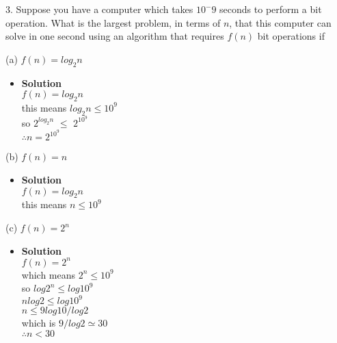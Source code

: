 \documentclass[11pt]{article}
\begin{document}
\begin{enumerate}

\begin{flushleft}
{\large 3. Suppose you have a computer which takes $10^−9$ seconds to perform a bit operation. What is the
largest problem, in terms of $n$, that this computer can solve in one second using an algorithm that
requires $f(n)$ bit operations if}\\
\end{flushleft}


\large (a) $f(n) = log_2 n$\\


\begin{itemize}

\item \textbf{Solution}\\
\large  $f(n) = log_2 n$ \\
\large this means $log_2 n \leq 10^9$\\
\large so $2^{log_2n}$ $\leq$ $2^{10^9}$\\
\large $\therefore n = 2^{10^9}$\\
\end {itemize}


\large (b) $f(n) = n$\\


\begin{itemize}

\item \textbf{Solution}\\
\large  $f(n) = log_2 n$ \\
\large this means $n \leq 10^9$\\


\end {itemize}


\large (c) $f(n) = 2^n$\\


\begin{itemize}

\item \textbf{Solution}\\
\large  $f(n) = 2^n$\\
\large which means $2^n \leq 10^9$\\
\large so $log 2^n \leq log 10^9$\\
\large $nlog2 \leq log10^9$\\
\large $n \leq 9log 10/log 2$ \\
\large which is $9/log2 \simeq 30$\\
\large $\therefore n < 30$ \\



\end{itemize}
\end{enumerate}
\end{document}

